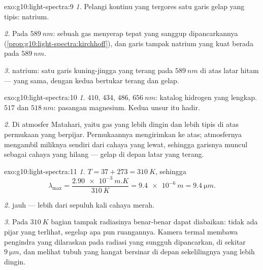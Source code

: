 \begin{solution}{exo:g10:light-spectra:9}
\emph{1.} Pelangi kontinu yang tergores satu garis gelap yang tipis:
 natrium.

\emph{2.} Pada $\qty{589}{nm}$: sebuah gas menyerap tepat  yang sanggup dipancarkannya
(\cref{prop:g10:light-spectra:kirchhoff}), dan garis tampak natrium
yang kuat berada pada $\qty{589}{nm}$.

\emph{3.}  natrium: satu garis kuning-jingga yang terang
pada $\qty{589}{nm}$ di atas latar hitam ---  yang
sama, dengan kedua  bertukar terang dan gelap.
\end{solution}

\begin{solution}{exo:g10:light-spectra:10}
\emph{1.} $410$, $434$, $486$, $\qty{656}{nm}$: katalog hidrogen yang
lengkap. $517$ dan $\qty{518}{nm}$: pasangan magnesium. Kedua unsur itu
hadir.

\emph{2.} Di atmosfer Matahari, yaitu gas yang lebih dingin dan lebih
tipis di atas permukaan yang berpijar. Permukaannya mengirimkan
 ke atas; atmosfernya mengambil 
miliknya sendiri dari cahaya yang lewat, sehingga garisnya muncul
sebagai cahaya yang hilang --- gelap di depan latar yang terang.
\end{solution}

\begin{solution}{exo:g10:light-spectra:11}
\emph{1.} $T = 37 + 273 = \qty{310}{K}$, sehingga
\[
\lambda_{\max} = \frac{\qty{2.90e-3}{m.K}}{\qty{310}{K}}
= \qty{9.4e-6}{m} = \qty{9.4}{\micro m}.
\]

\emph{2.}  jauh --- lebih dari sepuluh kali 
cahaya merah.

\emph{3.} Pada $\qty{310}{K}$ bagian tampak radiasinya benar-benar
dapat diabaikan: tidak ada pijar yang terlihat, segelap apa pun
ruangannya. Kamera termal membawa pengindra yang dilaraskan pada
radiasi yang sungguh dipancarkan, di sekitar $\qty{9}{\micro m}$, dan
melihat tubuh yang hangat bersinar di depan sekelilingnya yang lebih
dingin.
\end{solution}

